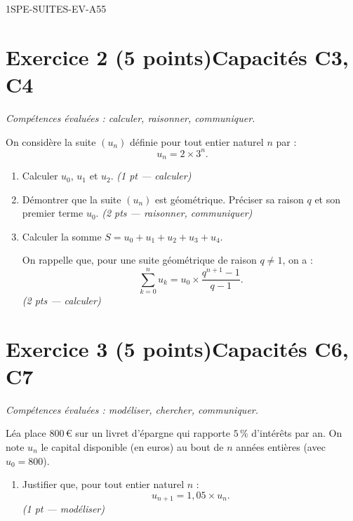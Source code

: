 \begin{evaluation}{1SPE-SUITES-EV-A}{55}
\section*{Exercice 2 \ifnxVersionProfesseur\hfill (5 points)\fi \hfill Capacités C3, C4}

\textit{Compétences évaluées : calculer, raisonner, communiquer.}

\medskip
On considère la suite $(u_n)$ définie pour tout entier naturel $n$ par :
\[
  u_n = 2 \times 3^n.
\]

\begin{enumerate}
  \item Calculer $u_0$, $u_1$ et $u_2$.
  \ifnxVersionProfesseur\hfill\textit{(1 pt — calculer)}\fi

  \item Démontrer que la suite $(u_n)$ est géométrique. Préciser sa raison $q$ et son premier terme $u_0$.
  \ifnxVersionProfesseur\hfill\textit{(2 pts — raisonner, communiquer)}\fi

  \item Calculer la somme $S = u_0 + u_1 + u_2 + u_3 + u_4$.

  On rappelle que, pour une suite géométrique de raison $q
\neq 1$, on a :
  \[
    \sum_{k=0}^{n} u_k = u_0 \times \frac{q^{n+1} - 1}{q - 1}.
  \]
  \ifnxVersionProfesseur\hfill\textit{(2 pts — calculer)}\fi
\end{enumerate}

\section*{Exercice 3 \ifnxVersionProfesseur\hfill (5 points)\fi \hfill Capacités C6, C7}

\textit{Compétences évaluées : modéliser, chercher, communiquer.}

\medskip
Léa place $800$\,€ sur un livret d'épargne qui rapporte $5\,\%$ d'intérêts par an. On note $u_n$ le capital disponible (en euros) au bout de $n$ années entières (avec $u_0 = 800$).

\begin{enumerate}
  \item Justifier que, pour tout entier naturel $n$ :
  \[
    u_{n+1} = 1{,}05 \times u_n.
  \]
  \ifnxVersionProfesseur\hfill\textit{(1 pt — modéliser)}\fi


\end{enumerate}
\end{evaluation}
